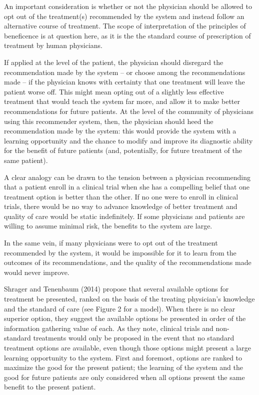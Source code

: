 \documentclass[]{spie}  %
\begin{document}
An important consideration is whether or not the physician should be allowed to opt out of the treatment(s) recommended by the system and instead follow an alternative course of treatment. The scope of interpretation of the principles of beneficence is at question here, as it is the the standard course of prescription of treatment by human physicians.

If applied at the level of the patient, the physician should disregard the recommendation made by the system – or choose among the recommendations made – if the physician knows with certainty that one treatment will leave the patient worse off. This might mean opting out of a slightly less effective treatment that would teach the system far more, and allow it to make better recommendations for future patients. At the level of the community of physicians using this recommender system, then, the physician should heed the recommendation made by the system: this would provide the system with a learning opportunity and the chance to modify and improve its diagnostic ability for the benefit of future patients (and, potentially, for future treatment of the same patient).

A clear analogy can be drawn to the tension between a physician recommending that a patient enroll in a clinical trial when she has a compelling belief that one treatment option is better than the other. If no one were to enroll in clinical trials, there would be no way to advance knowledge of better treatment and quality of care would be static indefinitely. If some physicians and patients are willing to assume minimal risk, the benefits to the system are large.

In the same vein, if many physicians were to opt out of the treatment recommended by the system, it would be impossible for it to learn from the outcomes of its recommendations, and the quality of the recommendations made would never improve.

Shrager and Tenenbaum (2014) propose that several available options for treatment be presented, ranked on the basis of the treating physician’s knowledge and the standard of care (see Figure 2 for a model). When there is no clear superior option, they suggest the available options be presented in order of the information gathering value of each. As they note, clinical trials and non-standard treatments would only be proposed in the event that no standard treatment options are available, even though those options might present a large learning opportunity to the system. First and foremost, options are ranked to maximize the good for the present patient; the learning of the system and the good for future patients are only considered when all options present the same benefit to the present patient.
\end{document}
